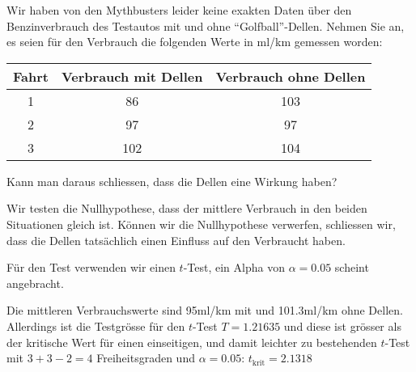 Wir haben von den Mythbusters leider keine exakten Daten über den
Benzinverbrauch des Testautos mit und ohne ``Golfball''-Dellen.
Nehmen Sie an, es seien für den Verbrauch die folgenden Werte in ml/km
gemessen worden:
\begin{center}
\begin{tabular}{ccc}
\hline
Fahrt&Verbrauch mit Dellen&Verbrauch ohne Dellen\\
\hline
1&86&103\\
2&97&97\\
3&102&104\\
\hline
\end{tabular}
\end{center}
Kann man daraus schliessen, dass die Dellen eine Wirkung haben?

\begin{loesung}
Wir testen die Nullhypothese, dass der mittlere Verbrauch in den
beiden Situationen gleich ist.
Können wir die Nullhypothese verwerfen, schliessen wir, dass die
Dellen tatsächlich einen Einfluss auf den Verbraucht haben.

Für den Test verwenden wir einen $t$-Test, ein Alpha von
$\alpha=0.05$ scheint angebracht.

Die mittleren Verbrauchswerte sind 95ml/km mit und 101.3ml/km ohne
Dellen.
Allerdings ist die Testgrösse für den $t$-Test
$T=1.21635$ und diese ist grösser als der kritische Wert für
einen einseitigen, und damit leichter zu bestehenden $t$-Test mit
$3+3-2=4$ Freiheitsgraden und
$\alpha=0.05$: $t_{\text{krit}}=2.1318$
\end{loesung}

